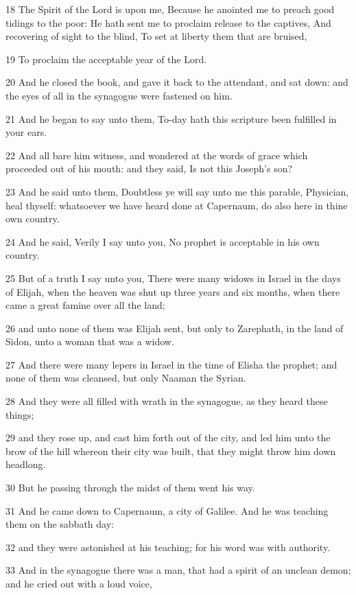 \par 18 The Spirit of the Lord is upon me, Because he anointed me to preach good tidings to the poor: He hath sent me to proclaim release to the captives, And recovering of sight to the blind, To set at liberty them that are bruised,
\par 19 To proclaim the acceptable year of the Lord.
\par 20 And he closed the book, and gave it back to the attendant, and sat down: and the eyes of all in the synagogue were fastened on him.
\par 21 And he began to say unto them, To-day hath this scripture been fulfilled in your ears.
\par 22 And all bare him witness, and wondered at the words of grace which proceeded out of his mouth: and they said, Is not this Joseph's son?
\par 23 And he said unto them, Doubtless ye will say unto me this parable, Physician, heal thyself: whatsoever we have heard done at Capernaum, do also here in thine own country.
\par 24 And he said, Verily I say unto you, No prophet is acceptable in his own country.
\par 25 But of a truth I say unto you, There were many widows in Israel in the days of Elijah, when the heaven was shut up three years and six months, when there came a great famine over all the land;
\par 26 and unto none of them was Elijah sent, but only to Zarephath, in the land of Sidon, unto a woman that was a widow.
\par 27 And there were many lepers in Israel in the time of Elisha the prophet; and none of them was cleansed, but only Naaman the Syrian.
\par 28 And they were all filled with wrath in the synagogue, as they heard these things;
\par 29 and they rose up, and cast him forth out of the city, and led him unto the brow of the hill whereon their city was built, that they might throw him down headlong.
\par 30 But he passing through the midst of them went his way.
\par 31 And he came down to Capernaum, a city of Galilee. And he was teaching them on the sabbath day:
\par 32 and they were astonished at his teaching; for his word was with authority.
\par 33 And in the synagogue there was a man, that had a spirit of an unclean demon; and he cried out with a loud voice,
